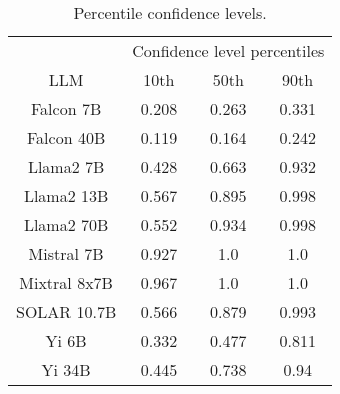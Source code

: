 \begin{table*}
\centering
\begin{tabular}{c|c|c|c}
& \multicolumn{3}{c}{Confidence level percentiles} \\ 
LLM & 10th & 50th & 90th\\ \hline
Falcon 7B & 0.208 & 0.263 & 0.331\\
Falcon 40B & 0.119 & 0.164 & 0.242\\
Llama2 7B & 0.428 & 0.663 & 0.932\\
Llama2 13B & 0.567 & 0.895 & 0.998\\
Llama2 70B & 0.552 & 0.934 & 0.998\\
Mistral 7B & 0.927 & 1.0 & 1.0\\
Mixtral 8x7B & 0.967 & 1.0 & 1.0\\
SOLAR 10.7B & 0.566 & 0.879 & 0.993\\
Yi 6B & 0.332 & 0.477 & 0.811\\
Yi 34B & 0.445 & 0.738 & 0.94\\
\hline
\end{tabular}
\caption{Percentile confidence levels.}
\label{tab:percentile_conf}
\end{table*}

